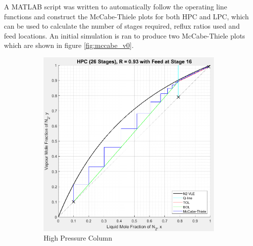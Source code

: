         \noindent A MATLAB script was written to automatically follow the operating line functions and construct the McCabe-Thiele plots for both HPC and LPC, which can be used to calculate the number of stages required, reflux ratios used and feed locations. An initial simulation is ran to produce two McCabe-Thiele plots which are shown in figure \ref{fig:mccabe_v0}.\\
        \begin{figure}[H]
            \begin{subfigure}{0.49\textwidth}
                \includegraphics[width=\linewidth]{HPC_v0.jpeg}
                \caption{High Pressure Column}
                \label{fig:HPC_v0}
            \end{subfigure}
            \hspace*{\fill} %
            \begin{subfigure}{0.49\textwidth}

\end{subfigure}
\end{figure}
